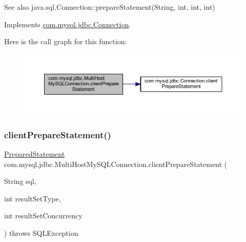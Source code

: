 \begin{DoxySeeAlso}{See also}
java.\+sql.\+Connection\+::prepare\+Statement(\+String, int, int, int) 
\end{DoxySeeAlso}


Implements \mbox{\hyperlink{interfacecom_1_1mysql_1_1jdbc_1_1_connection_af2c3e5b2cd7768c4fdf7ca4e75558bbf}{com.\+mysql.\+jdbc.\+Connection}}.

Here is the call graph for this function\+:
\nopagebreak
\begin{figure}[H]
\begin{center}
\leavevmode
\includegraphics[width=350pt]{classcom_1_1mysql_1_1jdbc_1_1_multi_host_my_s_q_l_connection_a5b3d4ce08f970c43ce42d939eae35b38_cgraph}
\end{center}
\end{figure}
\mbox{\label{classcom_1_1mysql_1_1jdbc_1_1_multi_host_my_s_q_l_connection_ad04846601b79203af77929064f64c043}} 
\subsubsection{\texorpdfstring{client\+Prepare\+Statement()}{clientPrepareStatement()}\hspace{0.1cm}{\footnotesize\ttfamily [2/6]}}
{\footnotesize\ttfamily \mbox{\hyperlink{classcom_1_1mysql_1_1jdbc_1_1_prepared_statement}{Prepared\+Statement}} com.\+mysql.\+jdbc.\+Multi\+Host\+My\+S\+Q\+L\+Connection.\+client\+Prepare\+Statement (\begin{DoxyParamCaption}\item[{String}]{sql,  }\item[{int}]{result\+Set\+Type,  }\item[{int}]{result\+Set\+Concurrency }\end{DoxyParamCaption}) throws S\+Q\+L\+Exception}

